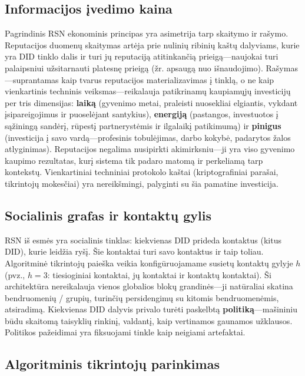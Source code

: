 \documentclass[11pt,a4paper,twocolumn]{article}
\begin{document}
\subsection{Informacijos įvedimo kaina}

Pagrindinis RSN ekonominis principas yra asimetrija tarp skaitymo ir rašymo. Reputacijos duomenų skaitymas artėja prie nulinių ribinių kaštų dalyviams, kurie yra DID tinklo dalis ir turi jų reputaciją atitinkančią prieigą---naujokai turi palaipsniui užsitarnauti platesnę prieigą (žr. apsaugą nuo išnaudojimo). Rašymas---suprantamas kaip tvarus reputacijos materializavimas į tinklą, o ne kaip vienkartinis techninis veiksmas---reikalauja patikrinamų kaupiamųjų investicijų per tris dimensijas: \textbf{laiką} (gyvenimo metai, praleisti nuosekliai elgiantis, vykdant įsipareigojimus ir puoselėjant santykius), \textbf{energiją} (pastangos, investuotos į sąžiningą sandėrį, rūpestį partnerystėmis ir ilgalaikį patikimumą) ir \textbf{pinigus} (investicija į savo vardą---profesinis tobulėjimas, darbo kokybė, padarytos žalos atlyginimas). Reputacijos negalima nusipirkti akimirksniu---ji yra viso gyvenimo kaupimo rezultatas, kurį sistema tik padaro matomą ir perkeliamą tarp kontekstų. Vienkartiniai techniniai protokolo kaštai (kriptografiniai parašai, tikrintojų mokesčiai) yra nereikšmingi, palyginti su šia pamatine investicija.

\subsection{Socialinis grafas ir kontaktų gylis}

RSN iš esmės yra socialinis tinklas: kiekvienas DID prideda kontaktus (kitus DID), kurie leidžia ryšį. Šie kontaktai turi savo kontaktus ir taip toliau. Algoritminė tikrintojų paieška veikia konfigūruojamame susietų kontaktų gylyje $h$ (pvz., $h=3$: tiesioginiai kontaktai, jų kontaktai ir kontaktų kontaktai). Ši architektūra nereikalauja vienos globalios blokų grandinės---ji natūraliai skatina bendruomenių / grupių, turinčių persidengimų su kitomis bendruomenėmis, atsiradimą. Kiekvienas DID dalyvis privalo turėti paskelbtą \textbf{politiką}---mašininiu būdu skaitomą taisyklių rinkinį, valdantį, kaip vertinamos gaunamos užklausos. Politikos pažeidimai yra fiksuojami tinkle kaip neigiami artefaktai.

\subsection{Algoritminis tikrintojų parinkimas}
\end{document}
